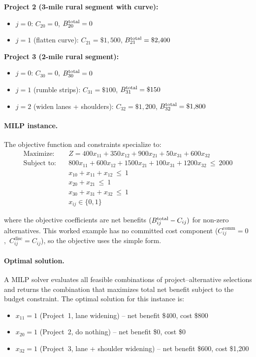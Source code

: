 \textbf{Project 2 (3-mile rural segment with curve):}
\begin{itemize}[leftmargin=2em, itemsep=2pt]
  \item $j = 0$: $C_{20} = 0$, $B^{\mathrm{total}}_{20} = 0$
  \item $j = 1$ (flatten curve): $C_{21} = \$1{,}500$, $B^{\mathrm{total}}_{21} = \$2{,}400$
\end{itemize}

\textbf{Project 3 (2-mile rural segment):}
\begin{itemize}[leftmargin=2em, itemsep=2pt]
  \item $j = 0$: $C_{30} = 0$, $B^{\mathrm{total}}_{30} = 0$
  \item $j = 1$ (rumble strips): $C_{31} = \$100$, $B^{\mathrm{total}}_{31} = \$150$
  \item $j = 2$ (widen lanes + shoulders): $C_{32} = \$1{,}200$, $B^{\mathrm{total}}_{32} = \$1{,}800$
\end{itemize}

\paragraph{MILP instance.} The objective function and constraints
specialize to:
\begin{equation*}
\begin{aligned}
\text{Maximize:}\quad & Z = 400 x_{11} + 350 x_{12} + 900 x_{21} + 50 x_{31} + 600 x_{32} \\[4pt]
\text{Subject to:}\quad & 800 x_{11} + 600 x_{12} + 1500 x_{21} + 100 x_{31} + 1200 x_{32}\ \leq\ 2000 \\
& x_{10} + x_{11} + x_{12}\ \leq\ 1 \\
& x_{20} + x_{21}\ \leq\ 1 \\
& x_{30} + x_{31} + x_{32}\ \leq\ 1 \\
& x_{ij} \in \{0, 1\}
\end{aligned}
\end{equation*}

\noindent where the objective coefficients are net benefits
$(B^{\mathrm{total}}_{ij} - C_{ij})$ for non-zero alternatives. This worked example
has no committed cost component
($C_{ij}^{\mathrm{comm}} = 0$,\ $C_{ij}^{\mathrm{disc}} = C_{ij}$), so
the objective uses the simple form.

\paragraph{Optimal solution.} A MILP solver evaluates all feasible
combinations of project--alternative selections and returns the
combination that maximizes total net benefit subject to the budget
constraint. The optimal solution for this instance is:
\begin{itemize}[leftmargin=2em, itemsep=2pt]
  \item $x_{11} = 1$ (Project~1, lane widening) -- net benefit \$400, cost \$800
  \item $x_{20} = 1$ (Project~2, do nothing) -- net benefit \$0, cost \$0
  \item $x_{32} = 1$ (Project~3, lane + shoulder widening) -- net benefit \$600, cost \$1{,}200
\end{itemize}

